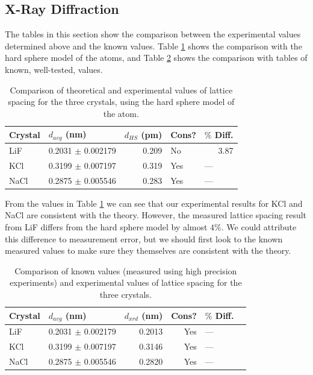 \documentclass[%
 reprint,
 amsmath,amssymb,
 aps,
 pra,
]{revtex4-1}
\begin{document}
\subsection{X-Ray Diffraction}

The tables in this section show the comparison between the experimental values determined above and the known values. Table \ref{table:xrd_comparison_hard_sphere} shows the comparison with the hard sphere model of the atoms, and Table \ref{table:xrd_comparison_known} shows the comparison with tables of known, well-tested, values.

\begin{table}[htbp]
	\begin{center}
	\begin{tabular}{|l|r|r|l|l|}
		\hline
		Crystal & \multicolumn{1}{l|}{$d_{avg}$ (nm)}  & \multicolumn{1}{l|}{$d_{HS}$ (pm)} & Cons? & $\%$ Diff. \\ \hline
		LiF & 0.2031 $\pm$ 0.002179 & 0.209 & No & \multicolumn{1}{r|}{3.87} \\ \hline
		KCl & 0.3199 $\pm$ 0.007197 & 0.319 & Yes & --- \\ \hline
		NaCl & 0.2875 $\pm$ 0.005546 & 0.283 & Yes & --- \\ \hline
	\end{tabular}
	\end{center}
	\caption{Comparison of theoretical and experimental values of lattice spacing for the three crystals, using the hard sphere model of the atom.}
	\label{table:xrd_comparison_hard_sphere}
\end{table}

From the values in Table \ref{table:xrd_comparison_hard_sphere} we can see that our experimental results for KCl and NaCl are consistent with the theory. However, the measured lattice spacing result from LiF differs from the hard sphere model by almost $4\%$. We could attribute this difference to measurement error, but we should first look to the known measured values to make sure they themselves are consistent with the theory.

\begin{table}[htbp]
	\begin{center}
	\begin{tabular}{|l|r|r|r|l|l|}
		\hline
		Crystal & \multicolumn{1}{l|}{$d_{avg}$ (nm)} & \multicolumn{1}{l|}{$d_{xrd}$ (nm)} & Cons? & $\%$ Diff. \\ \hline
		LiF & 0.2031 $\pm$ 0.002179 & 0.2013 & Yes & --- \\ \hline
		KCl & 0.3199 $\pm$ 0.007197 & 0.3146 & Yes & --- \\ \hline
		NaCl & 0.2875 $\pm$ 0.005546 & 0.2820 & Yes & --- \\ \hline
	\end{tabular}
	\end{center}
	\caption{Comparison of known values (measured using high precision experiments) and experimental values of lattice spacing for the three crystals.}
	\label{table:xrd_comparison_known}
\end{table}
\end{document}
